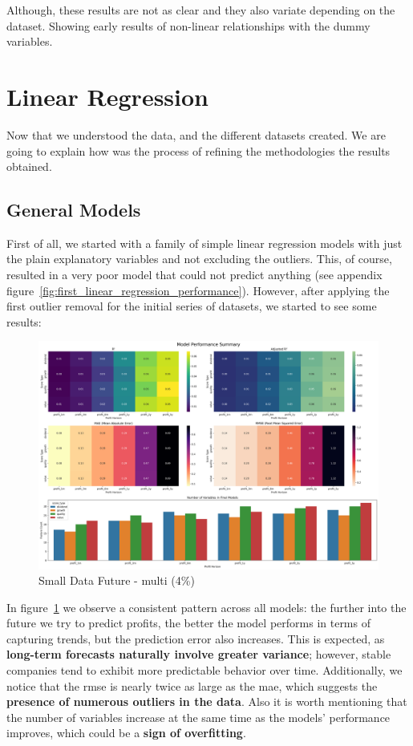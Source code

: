 \documentclass[11pt,english,a4paper,hidelinks]{book}
\begin{document}
\noindent Although, these results are not as clear and they also variate depending on the dataset. Showing early results of non-linear relationships with the dummy variables.

\section{Linear Regression}

Now that we understood the data, and the different datasets created. We are going to explain how was the process of refining the methodologies the results obtained.

\subsection{General Models}

First of all, we started with a family of simple linear regression models with just the plain explanatory variables and not excluding the outliers. This, of course, resulted in a very poor model that could not predict anything (see appendix figure~\ref{fig:first_linear_regression_performance}). However, after applying the first outlier removal for the initial series of datasets, we started to see some results:

\begin{figure}[H]
    \centering
    \includegraphics[width=1\textwidth]{images/code/models/linear_regression/first_model/Small Data future - Multi performance.png}
    \caption{Small Data Future - \acrshort{multi} (4\%)}
    \label{fig:first_linear_regression}
\end{figure}

\noindent In figure~\ref{fig:first_linear_regression} we observe a consistent pattern across all models: the further into the future we try to predict profits, the better the model performs in terms of capturing trends, but the prediction error also increases. This is expected, as \textbf{long-term forecasts naturally involve greater variance}; however, stable companies tend to exhibit more predictable behavior over time. Additionally, we notice that the \acrshort{rmse} is nearly twice as large as the \acrshort{mae}, which suggests the \textbf{presence of numerous outliers in the data}. Also it is worth mentioning that the number of variables increase at the same time as the models' performance improves, which could be a \textbf{sign of overfitting}.
\end{document}
